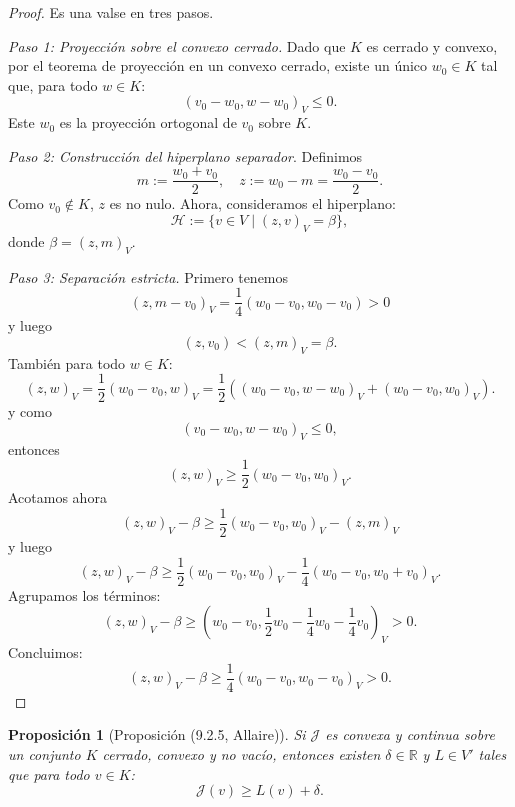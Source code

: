 \documentclass[12pt]{book}
\newtheorem{proposition}{Proposición}
\theoremstyle{definition}
\theoremstyle{plain}
\theoremstyle{remark}
\begin{document}
\begin{proof} Es una valse en tres pasos.

\medskip

    \emph{Paso 1: Proyección sobre el convexo cerrado.}
    Dado que \(K\) es cerrado y convexo, por el teorema de proyección en un convexo cerrado, existe un único \(w_0 \in K\) tal que, para todo \(w \in K\):
    \[ ( v_0 - w_0 , w - w_0 )_V \leq 0.
    \]
    Este \(w_0\) es la proyección ortogonal de \(v_0\) sobre \(K\).

\medskip

    \emph{Paso 2: Construcción del hiperplano separador}.
    Definimos 
    \[
    m := \frac{w_0 + v_0}{2}, \quad
    z := w_0 - m = \frac{w_0 - v_0}{2}.
    \]
    Como $v_0 \notin K$, $z$ es no nulo.
    Ahora,
    consideramos el hiperplano:
    \[
    \mathcal{H} := \{ v \in V \mid ( z , v )_V = \beta \},
    \]
    donde \(\beta = ( z , m )_V\).

\medskip

    \emph{Paso 3: Separación estricta.}
    Primero tenemos
    \[
    (z, m - v_0)_V 
    = \frac14( w_0 - v_0 , w_0 - v_0 )
    > 0
    \]
    y luego
    \[
    (z , v_0 ) < ( z , m )_V = \beta.
    \]
    Tambi\'en para todo \(w \in K\):
    \[
    (z,w)_V 
    =
    \frac12(w_0 - v_0, w )_V
    =
    \frac12
    \left (
    (w_0 - v_0, w - w_0 )_V
    + ( w_0 - v_0 , w_0 )_V \right ).
    \]
    y como 
    \[ ( v_0 - w_0 , w - w_0 )_V \leq 0,\]
    entonces
    \[
    (z,w)_V \geq
    \frac12
    ( w_0 - v_0 , w_0 )_V.
    \]
    Acotamos ahora
    \[
    (z,w)_V - \beta 
    \geq
        \frac12
    ( w_0 - v_0 , w_0 )_V
    -(z,m)_V
    \]
    y luego
    \[
    (z,w)_V - \beta 
    \geq
        \frac12
    ( w_0 - v_0 , w_0 )_V
    - \frac14 ( w_0 - v_0 , w_0 + v_0 )_V.
    \]
    Agrupamos los términos:
    \[
    (z,w)_V - \beta 
    \geq
    ( w_0 - v_0 ,\frac12 w_0 
    - \frac14w_0 - \frac14v_0)_V > 0.
    \]
    Concluimos:
    \[
    (z,w)_V - \beta 
    \geq
    \frac14
    ( w_0 - v_0 , w_0 
    - v_0)_V > 0.
    \]
\end{proof}

\begin{proposition}[Proposición (9.2.5, Allaire)]
\label{propAllaire925}
Si $\mathcal{J}$ es convexa y continua sobre un conjunto $K$ cerrado, convexo y no vacío, entonces existen $\delta \in \mathbb{R}$ y $L \in V'$ tales que para todo $v \in K$:
\[
\mathcal{J}(v) \geq L(v) + \delta.
\]
\end{proposition}
\end{document}
